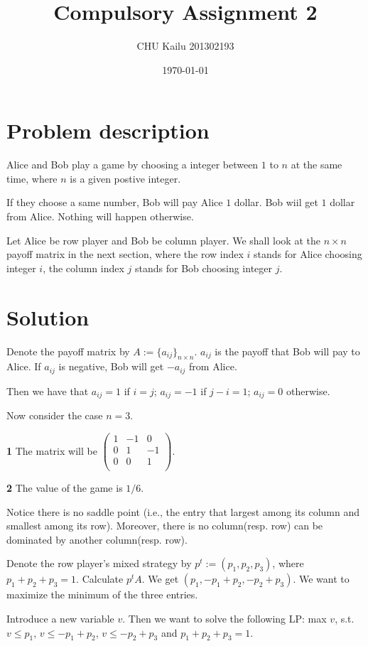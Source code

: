 \documentclass[10pt]{article}
\title{Compulsory Assignment 2}
\author{CHU Kailu 201302193}
\date{\today}
\begin{document}
\maketitle

\section{Problem description}
Alice and Bob play a game by choosing a integer between $1$ to $n$ at the same time, where $n$ is a given postive integer.

If they choose a same number, Bob will pay Alice $1$ dollar. 
Bob wiil get $1$ dollar from Alice. 
Nothing will happen otherwise.

Let Alice be row player and Bob be column player.
We shall look at the $n \times n$ payoff matrix in the next section,
where the row index $i$ stands for Alice choosing integer $i$,
the column index $j$ stands for Bob choosing integer $j$.

\newpage

\section{Solution}
Denote the payoff matrix by $A:=\{a_{ij}\}_{n\times n}$. 
$a_{ij}$ is the payoff that Bob will pay to Alice.
If $a_{ij}$ is negative, Bob will get $-a_{ij}$ from Alice.

Then we have that $a_{ij} = 1$ if $i=j$; 
$a_{ij} = -1$ if $j-i=1$; 
$a_{ij} = 0$ otherwise.

Now consider the case $n = 3$.

\noindent\textbf{1} 
The matrix will be 
$
\begin{pmatrix}
1 & -1 & 0 \\
0 & 1 & -1 \\
0 & 0 & 1 \\
\end{pmatrix} 
$.

\noindent\textbf{2}
The value of the game is $1/6$.

Notice there is no saddle point
(i.e., the entry that largest among its column and smallest among its row).
Moreover, there is no column(resp. row) can be dominated by another column(resp. row).

Denote the row player's mixed strategy by $p^t:=(p_1,p_2,p_3)$, 
where $p_1+p_2+p_3=1$.
Calculate $p^tA$. We get $(p_1,-p_1+p_2,-p_2+p_3)$.
We want to maximize the minimum of the three entries.

Introduce a new variable $v$. Then we want to solve the following LP:
max $v$, s.t. $v \leq p_1$, $v \leq -p_1+p_2$, $v \leq -p_2+p_3$ and $p_1+p_2+p_3=1$.
\end{document}
